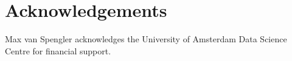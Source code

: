 \section*{Acknowledgements}
Max van Spengler acknowledges the University of Amsterdam Data Science Centre for financial support.